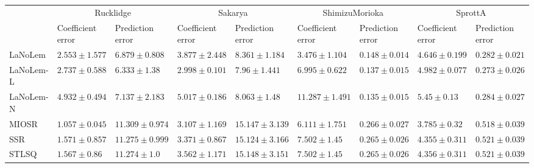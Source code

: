 \begin{table*}
{\begin{tabular}{lllllllll}
 & \multicolumn{2}{c}{Rucklidge} & \multicolumn{2}{c}{Sakarya} & \multicolumn{2}{c}{ShimizuMorioka} & \multicolumn{2}{c}{SprottA} \\
 & Coefficient error & Prediction error & Coefficient error & Prediction error & Coefficient error & Prediction error & Coefficient error & Prediction error \\
\midrule
LaNoLem & $2.553\pm 1.577$ & $6.879\pm 0.808$ & $3.877\pm 2.448$ & $8.361\pm 1.184$ & $\mathbf{3.476}\pm 1.104$ & $0.148\pm 0.014$ & $4.646\pm 0.199$ & $0.282\pm 0.021$ \\
LaNoLem-L & $2.737\pm 0.588$ & $\mathbf{6.333}\pm 1.38$ & $\mathbf{2.998}\pm 0.101$ & $\mathbf{7.96}\pm 1.441$ & $6.995\pm 0.622$ & $0.137\pm 0.015$ & $4.982\pm 0.077$ & $\mathbf{0.273}\pm 0.026$ \\
LaNoLem-N & $4.932\pm 0.494$ & $7.137\pm 2.183$ & $5.017\pm 0.186$ & $8.063\pm 1.48$ & $11.287\pm 1.491$ & $\mathbf{0.135}\pm 0.015$ & $5.45\pm 0.13$ & $0.284\pm 0.027$ \\
MIOSR & $\mathbf{1.057}\pm 0.045$ & $11.309\pm 0.974$ & $3.107\pm 1.169$ & $15.147\pm 3.139$ & $6.111\pm 1.751$ & $0.266\pm 0.027$ & $\mathbf{3.785}\pm 0.32$ & $0.518\pm 0.039$ \\
SSR & $1.571\pm 0.857$ & $11.275\pm 0.999$ & $3.371\pm 0.867$ & $15.124\pm 3.166$ & $7.502\pm 1.45$ & $0.265\pm 0.026$ & $4.355\pm 0.311$ & $0.521\pm 0.039$ \\
STLSQ & $1.567\pm 0.86$ & $11.274\pm 1.0$ & $3.562\pm 1.171$ & $15.148\pm 3.151$ & $7.502\pm 1.45$ & $0.265\pm 0.026$ & $4.356\pm 0.311$ & $0.521\pm 0.039$ \\

\midrule


\end{tabular}}
\end{table*}
